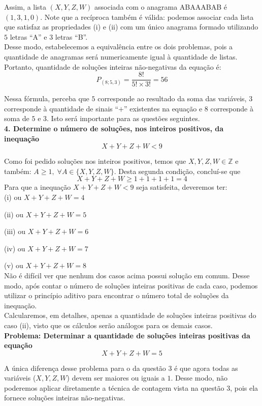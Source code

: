 \documentclass[12pt, a4paper]{article}
\begin{document}
Assim, a lista \((X,Y,Z,W)\) associada com o anagrama ABAAABAB é \((1,3,1,0)\). Note que a recíproca também é válida: podemos associar cada lista que satisfaz as propriedades (i) e (ii) com um único anagrama formado utilizando \(5\) letras ``A'' e \(3\) letras ``B''. \\

Desse modo, estabelecemos a equivalência entre os dois problemas, pois a quantidade de anagramas será numericamente igual à quantidade de listas. Portanto, quantidade de soluções inteiras não-negativas da equação é: \[P_{(8; 5,3)} = \dfrac{8!}{5!\times 3!} = 56\] 

Nessa fórmula, perceba que \(5\) corresponde ao resultado da soma das variáveis, \(3\) corresponde à quantidade de sinais ``\(+\)'' existentes na equação e \(8\) corresponde à soma de \(5\) e \(3\). Isto será importante para as questões seguintes. \\

\textbf{4. Determine o número de soluções, nos inteiros positivos, da inequação \[X+Y+Z+W<9\]} 

Como foi pedido soluções nos inteiros positivos, temos que \(X, Y,Z,W \in \mathbb{Z}\) e também: \(A \geq 1, \; \forall A \in \{X, Y, Z, W\}\). Desta segunda condição, concluí-se que \[X+Y+Z+W \geq 1+1+1+1=4\]Para que a inequação \(X+Y+Z+W <9\) seja satisfeita, deveremos ter: \\

(i) ou \(X+Y+Z+W = 4\)

(ii) ou \(X+Y+Z+W = 5\)

(iii) ou \(X+Y+Z+W = 6\)

(iv) ou \(X+Y+Z+W = 7\)

(v) ou \(X+Y+Z+W = 8\) \\

Não é difícil ver que nenhum dos casos acima possui solução em comum. Desse modo, após contar o número de soluções inteiras positivas de cada caso, podemos utilizar o princípio aditivo para encontrar o número total de soluções da inequação. \\

Calcularemos, em detalhes, apenas a quantidade de soluções inteiras positivas do caso (ii), visto que os cálculos serão análogos para os demais casos.\\

\textbf{Problema: Determinar a quantidade de soluções inteiras positivas da equação \[X+Y+Z+W = 5\]} 

A única diferença desse problema para o da questão 3 é que agora todas as variáveis (\(X, Y, Z,W\)) devem ser maiores ou iguais a \(1\). Desse modo, não poderemos aplicar diretamente a técnica de contagem vista na questão 3, pois ela fornece soluções inteiras não-negativas. \\
\end{document}
